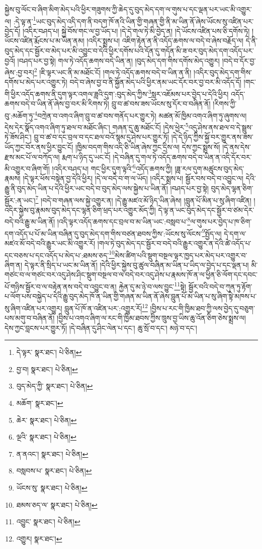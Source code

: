 སྐྱེས་བུ་ལོང་བ་ཞིག་མིག་མེད་པའི་ཕྱིར་གཟུགས་ཀྱི་ཆེད་དུ་བུད་མེད་དག་ལ་གུས་པ་དང་ལྡན་པར་ཡང་མི་འགྱུར་ལ། :དེ་ལྟ་ན་\footnote{དེ་ལྟར་  སྣར་ཐང་།  པེ་ཅིན། }ཡང་བུད་མེད་འདི་དག་ནི་བདག་ཁོ་ནའི་ཡིན་གྱི་གཞན་གྱི་ནི་མ་ཡིན་ནོ་ཞེས་ཡོངས་སུ་འཛིན་པར་བྱེད་དོ། །འདིར་བཤད་པ། སྐྱེ་བོས་གང་ལ་བྱ་ཡོད་པ། །དེ་དེ་གལ་ཏེ་མི་བྱེད་ན། །དེ་ཡོངས་འཛིན་པས་ཅི་དགོས་ཏེ། །ཡོངས་འཛིན་རྨོངས་པ་མ་ཡིན་ནམ། །འདིར་སྨྲས་པ། འཇིག་རྟེན་ན་ནི་འདོད་ཆགས་ལ་བདེ་བ་ཞེས་བརྗོད་ལ། དེ་ནི་བུད་མེད་དང་སྦྱོར་བ་མེད་པར་མི་འབྱུང་བ་དེའི་ཕྱིར་དགོས་པའི་དོན་དུ་གདོན་མི་ཟ་བར་བུད་མེད་དག་འདོད་པར་བྱའོ། །བཤད་པར་བྱ་སྟེ། གལ་ཏེ་འདོད་ཆགས་བདེ་ཡིན་ན། །བུད་མེད་དག་གིས་དགོས་མེད་འགྱུར། །བདེ་བ་དོར་བྱ་ཞེས་:བྱ་བར།\footnote{བྱ་བ།  སྣར་ཐང་།  པེ་ཅིན། } །ཇི་ལྟར་ཡང་ནི་མ་མཐོང་ངོ། །གལ་ཏེ་འདོད་ཆགས་བདེ་བ་ཡིན་ན་ནི། །འདིར་བུད་མེད་དག་གིས་དགོས་པ་མེད་པར་འགྱུར་ཏེ། བདེ་བ་ཞེས་བྱ་བ་ནི་སྐྱོན་མེད་པའི་ཕྱིར་ནམ་ཡང་དོར་བར་བྱ་བར་མི་འདོད་དོ། །གང་གི་ཕྱིར་འདོད་ཆགས་ནི་དུག་ལྟར་འགལ་ཟླའི་དུག་:བུད་མེད་ཀྱིས་\footnote{བུད་མེད་ཀྱི་  སྣར་ཐང་།  པེ་ཅིན། }སླར་འཇོམས་པར་བྱེད་པ་དེའི་ཕྱིར། འདོད་ཆགས་བདེ་བ་ཡིན་ནོ་ཞེས་བྱ་བར་མི་རིགས་ཏེ། བྲུ་བ་ཚ་བས་ཟས་ཡོངས་སུ་དོར་བ་བཞིན་ནོ། །རིགས་ཀྱི་བུ་:མཆོག་ཏུ་\footnote{མཆོག་  སྣར་ཐང་། }བཀྲེན་བ་འགའ་ཞིག་བྲུ་བ་ཚ་བས་གནོད་པར་གྱུར་ཏེ། མཚན་མོ་ཁྱིམ་འགའ་ཞིག་ཏུ་ཞུགས་ལ། དེས་དེར་སྣོད་འགའ་ཞིག་ཏུ་ཐལ་བ་མཐོང་ཞིང་། གཞན་དུ་ཆུ་མཐོང་ངོ། །དེས་ཕྱེར་\footnote{ཆེར་  སྣར་ཐང་།  པེ་ཅིན། }འདུ་ཤེས་ནས་ཐལ་བ་དེ་སྦྲུས་ཏེ་ཟོས་ཤིང་། བྲུ་བ་ཚ་བ་དང་བྲལ་བ་དང་ཐལ་བའོ་སྙམ་དུ་ཤེས་པར་གྱུར་ཏོ། །དེ་དེ་ཉིད་ཀྱིས་སྐྱོ་བར་གྱུར་ནས་ཟས་ཡོད་ཀྱང་བོར་ནས་ཕྱིར་བྱུང་ངོ། །ཁྱིམ་བདག་གིས་འདི་ཅི་ཡིན་ཞེས་ཀྱང་དྲིས་ལ། དེས་ཀྱང་སྨྲས་སོ། །དེ་ནས་དེས་རྫས་མང་པོ་ལ་བཀོད་ལ། རྨག་པ་ཉིད་དུ་ཡང་ངོ། །དེ་བཞིན་དུ་གལ་ཏེ་འདོད་ཆགས་བདེ་བ་ཡིན་ན་འདི་དོར་བར་མི་འགྱུར་བ་ཞིག་གོ། །འདིར་བཤད་པ། གང་ཕྱིར་དུག་ལྟའི་\footnote{ལྔའི་  སྣར་ཐང་།  པེ་ཅིན། }འདོད་ཆགས་ཀྱི། །ཟླ་རལ་དུག་མཚུངས་བུད་མེད་རྣམས། །དེ་ལྟར་ཕོས་བསྟེན་བྱ་དེའི་ཕྱིར། །དེ་ལ་བདེ་བ་ག་ལ་ཡོད། །འདིར་སྨྲས་པ། སྦྱོར་བས་བདེ་བ་འབྱུང་ལ། དེའི་རྒྱུ་ནི་བུད་མེད་ཡིན་པ་དེའི་ཕྱིར་ཡང་བདེ་བ་བུད་མེད་ལས་སྐྱེས་པ་ཡིན་ནོ། །བཤད་པར་བྱ་སྟེ། བུད་མེད་ལྷན་ཅིག་སྦྱོར་:ན་ཡང་།\footnote{ན་ནའང་།  སྣར་ཐང་།  པེ་ཅིན། } །བདེ་བ་གཞན་ལས་སྐྱེ་འགྱུར་ན། །དེ་རྒྱུ་མཛའ་མོ་ཉིད་ཡིན་ཞེས། །བླུན་པོ་མིན་པ་སུ་ཞིག་འཛིན། །འདིར་སྐྱེས་བུ་རྣམས་བུད་མེད་དང་ལྷན་ཅིག་ཕྲད་པར་འགྱུར་མོད་ཀྱི། དེ་ལྟ་ན་ཡང་བུད་མེད་དང་སྦྱོར་བ་ཙམ་དེར་བདེ་བའི་རྒྱུ་མ་ཡིན་ནོ། །འདི་ལྟར་འདོད་ཆགས་དང་བྲལ་བ་མ་ཡིན་ཡང་:བསླབ་པ་\footnote{བསླབས་པ་  སྣར་ཐང་།  པེ་ཅིན། }ལ་གུས་པར་བྱེད་པ་ཁ་ཅིག་དག་འདོད་པ་པོ་མ་ཡིན་བཞིན་དུ་བུད་མེད་དག་གིས་བཙན་ཐབས་ཀྱིས་:ཡོངས་སུ་ལོངས་\footnote{ཡོངས་སུ་  སྣར་ཐང་།  པེ་ཅིན། }སྤྱོད་ལ། དེ་དག་ལ་མཛའ་མོ་བདེ་བའི་རྒྱུར་ཡང་མི་འགྱུར་རོ། །གལ་ཏེ་བུད་མེད་དང་སྦྱོར་བ་བདེ་བའི་རྒྱུར་འགྱུར་ན་དེའི་ཚེ་འདོད་པ་དང་བཅས་པ་དང་འདོད་པ་མེད་པ་:ཐམས་ཅད་\footnote{ཐམས་ཅད་ལ་  སྣར་ཐང་།  པེ་ཅིན། }མེས་ཚིག་པའི་སྡུག་བསྔལ་ལྟར་ཁྱད་པར་མེད་པར་འགྱུར་བ་ཞིག་ན། དེ་ལྟར་ནི་སྲིད་པ་ཡང་མ་ཡིན་ནོ། །དེའི་ཕྱིར་སྐྱེས་བུ་ཚུལ་བཞིན་མ་ཡིན་པ་ཡིད་ལ་བྱེད་པ་དང་ལྡན་པ། མི་གཙང་བ་ལ་གཙང་བར་འདུ་ཤེས་ཤིང་སྡུག་བསྔལ་བ་ལ་བདེ་བར་འདུ་ཤེས་པ་རྣམས་ཁོ་ན་ལ་ཕྱིན་ཅི་ལོག་དང་དབང་པོ་གཉིས་སྦྱོར་བ་ལ་བརྟེན་ནས་བདེ་བ་འབྱུང་བ་ན། རྐྱེན་དུ་མ་ཉེ་བ་ལས་བྱུང་\footnote{འབྱུང་  སྣར་ཐང་།  པེ་ཅིན། }སྟེ། སྦྱོར་བའི་བདེ་བ་ཀུན་ཏུ་རྟོག་པ་ལོག་པས་བསྐྱེད་པ་དེའི་རྒྱུ་བུད་མེད་ཁོ་ན་ཡིན་གྱི་གཞན་མ་ཡིན་ནོ་ཞེས་བླུན་པོ་མ་ཡིན་པ་སུ་ཞིག་སྟེ་མཁས་པ་སུ་ཞིག་འཛིན་པར་འགྱུར། བླུན་པོ་ཁོ་ན་འཛིན་པར་:འགྱུར་རོ།\footnote{འགྱུར།  སྣར་ཐང་། } །བྱིས་པ་རང་གི་ཁྱིམ་ཐབ་ཀྱི་ལས་བྱེད་དུ་བཅུག་པས་མགུ་བ་བཞིན་ནོ། །བྱིས་པ་འགའ་ཞིག་ལ་རང་གི་ཁྱིམ་ཐབས་ཀྱིས་ཁྲུས་བྱ་ཡིས་ཆུ་འོན་ཅིག་ཅེས་སྨྲས་ལ། དེས་ཀྱང་བླངས་པར་གྱུར་ཏོ། །དེ་བཞིན་དུ་ཤིང་ལེན་པ་དང་། ཆུ་སྲོ་བ་དང་། མཉེ་བ་དང་། 